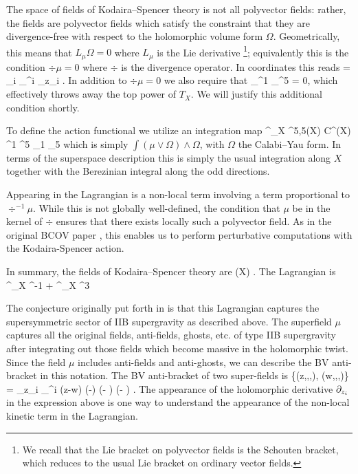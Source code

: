 \documentclass[../main.tex]{subfiles}
\begin{document}
The space of fields of Kodaira--Spencer theory is not all polyvector fields: rather, the fields are polyvector fields which satisfy the constraint that they are divergence-free with respect to the holomorphic volume form $\Omega$.
Geometrically, this means that $L_\mu \Omega = 0$ where $L_\mu$ is the Lie derivative \footnote{We recall that the Lie bracket on polyvector fields is the Schouten bracket, which reduces to the usual Lie bracket on ordinary vector fields.}; equivalently this is the condition $\div \mu = 0$ where $\div$ is the divergence operator.
In coordinates this reads
\beqn
\div = \sum_i \del_{\theta^i} \del_{z_i} .
\eeqn
In addition to $\div \mu = 0$ we also require that 
\beqn
\del_{\theta^1} \cdots \del_{\theta^5} \mu = 0,
\eeqn
which effectively throws away the top power of $T_X$. We will justify this additional condition shortly.

To define the action functional we utilize an integration map
\beqn\label{eqn:cyintegral}
\int^\Omega_X \colon \PV^{5,5}(X) \simeq C^\infty(X) \theta^1 \cdots \theta^5 \br \theta_1 \cdots \br \theta_5 \to \C
\eeqn
which is simply $\int ( \mu \vee \Omega) \wedge \Omega$, with $\Omega$ the Calabi--Yau form.
In terms of the superspace description this is simply the usual integration along $X$ together with the Berezinian integral along the odd directions.

Appearing in the Lagrangian is a non-local term involving a term proportional to $\div^{-1} \mu$.
While this is not globally well-defined, the condition that $\mu$ be in the kernel of $\div$ ensures that there exists locally such a polyvector field. As in the original BCOV paper \cite{BCOV}, this enables us to perform perturbative computations with the Kodaira-Spencer action. 

In summary, the fields of Kodaira--Spencer theory are
\beqn
\PV(X) \cap \ker \div .
\eeqn
The Lagrangian is
\beqn
{} \int^\Omega_X \mu \dbar \del^{-1} \mu +  \int^\Omega_X \mu^3 
\eeqn

The conjecture originally put forth in \cite{CLsugra} is that this Lagrangian captures the supersymmetric sector of IIB supergravity as described above.
The superfield $\mu$ captures all the original fields, anti-fields, ghosts, etc. of type IIB supergravity after integrating out those fields which become massive in the holomorphic twist.
Since the field $\mu$ includes anti-fields and anti-ghosts, we can describe the BV anti-bracket in this notation.
The BV anti-bracket of two super-fields is
\beqn
\{\mu(z,\zbar,\theta,\br \theta), \mu(w,\wbar,\eta,\br \eta)\} = \del_{z_i} \del_{\theta^i} \delta(z-w) \delta(\zbar-\wbar) (\br \theta - \br \eta) (\theta - \eta)  .
\eeqn
The appearance of the holomorphic derivative $\partial_{z_i}$ in the expression above is one way to understand the appearance of the non-local kinetic term in the Lagrangian.
\end{document}
